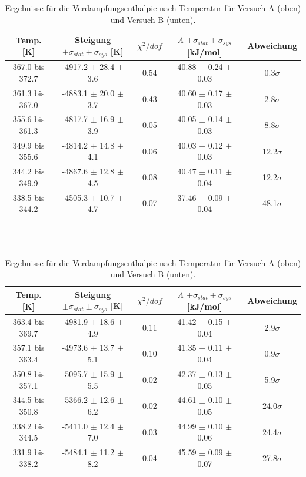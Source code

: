 \documentclass[12pt,a4paper]{article}
\begin{document}
\begin{table}[H]
	\begin{tabular}{|c|c|c|c|c|}
		\hline
		\textbf{Temp. [K]} & \textbf{Steigung $\pm \sigma_{stat} \pm \sigma_{sys}$ [K]} & $\chi ^2/dof$ & \textbf{$\Lambda$ $\pm \sigma_{stat} \pm \sigma_{sys}$ [kJ/mol]} & \textbf{Abweichung} \\
		\hline
		367.0 bis 372.7 & -4917.2 $\pm$ 28.4 $\pm$ 3.6 & 0.54 & 40.88 $\pm$ 0.24 $\pm$ 0.03 & 0.3$\sigma$ \\
		\hline
		361.3 bis 367.0 & -4883.1 $\pm$ 20.0 $\pm$ 3.7 & 0.43 & 40.60 $\pm$ 0.17 $\pm$ 0.03 & 2.8$\sigma$ \\
		\hline
		355.6 bis 361.3 & -4817.7 $\pm$ 16.9 $\pm$ 3.9 & 0.05 & 40.05 $\pm$ 0.14 $\pm$ 0.03 & 8.8$\sigma$ \\
		\hline
		349.9 bis 355.6 & -4814.2 $\pm$ 14.8 $\pm$ 4.1 & 0.06 & 40.03 $\pm$ 0.12 $\pm$ 0.03 & 12.2$\sigma$ \\
		\hline
		344.2 bis 349.9 & -4867.6 $\pm$ 12.8 $\pm$ 4.5 & 0.08 & 40.47 $\pm$ 0.11 $\pm$ 0.04 & 12.2$\sigma$ \\
		\hline
		338.5 bis 344.2 & -4505.3 $\pm$ 10.7 $\pm$ 4.7 & 0.07 & 37.46 $\pm$ 0.09 $\pm$ 0.04 & 48.1$\sigma$ \\
		\hline 
	\end{tabular}\\		
\\

	\begin{tabular}{|c|c|c|c|c|}
		\hline
		\textbf{Temp. [K]} & \textbf{Steigung $\pm \sigma_{stat} \pm \sigma_{sys}$ [K]} & $\chi ^2/dof$ & \textbf{$\Lambda$ $\pm \sigma_{stat} \pm \sigma_{sys}$ [kJ/mol]} & \textbf{Abweichung} \\
		\hline
		363.4 bis 369.7 & -4981.9 $\pm$ 18.6 $\pm$ 4.9 & 0.11 & 41.42 $\pm$ 0.15 $\pm$ 0.04 & 2.9$\sigma$ \\
		\hline
		357.1 bis 363.4 & -4973.6 $\pm$ 13.7 $\pm$ 5.1 & 0.10 & 41.35 $\pm$ 0.11 $\pm$ 0.04 & 0.9$\sigma$ \\
		\hline
		350.8 bis 357.1 & -5095.7 $\pm$ 15.9 $\pm$ 5.5 & 0.02 & 42.37 $\pm$ 0.13 $\pm$ 0.05 & 5.9$\sigma$ \\
		\hline
		344.5 bis 350.8 & -5366.2 $\pm$ 12.6 $\pm$ 6.2 & 0.02 & 44.61 $\pm$ 0.10 $\pm$ 0.05 & 24.0$\sigma$ \\
		\hline
		338.2 bis 344.5 & -5411.0 $\pm$ 12.4 $\pm$ 7.0 & 0.03 & 44.99 $\pm$ 0.10 $\pm$ 0.06 & 24.4$\sigma$ \\
		\hline
		331.9 bis 338.2 & -5484.1 $\pm$ 11.2 $\pm$ 8.2 & 0.04 & 45.59 $\pm$ 0.09 $\pm$ 0.07 & 27.8$\sigma$ \\
		\hline
	\end{tabular}



	\caption{Ergebnisse für die Verdampfungsenthalpie nach Temperatur für Versuch A (oben) und Versuch B (unten).}
	\label{tab:enthalpie_A}
\end{table}
\end{document}
